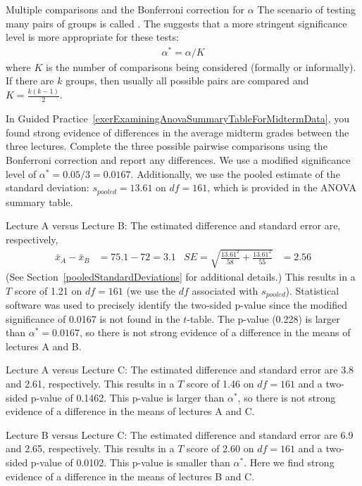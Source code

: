 \begin{onebox}{Multiple comparisons and the Bonferroni correction for $\alpha$}
The scenario of testing many pairs of groups is called . The  suggests that a more stringent significance level is more appropriate for these tests:
\begin{align*}
\alpha^* = \alpha / K
\end{align*}
where $K$ is the number of comparisons being considered (formally or informally). If there are $k$ groups, then usually all possible pairs are compared and $K=\frac{k(k-1)}{2}$.
\end{onebox}

\begin{examplewrap}
\begin{nexample}{In Guided Practice~\ref{exerExaminingAnovaSummaryTableForMidtermData}, you found strong evidence of differences in the average midterm grades between the three lectures. Complete the three possible pairwise comparisons using the Bonferroni correction and report any differences.} \label{multipleComparisonsOfThreeStatClasses}
We use a modified significance level of $\alpha^* = 0.05/3 = 0.0167$. Additionally, we use the pooled estimate of the standard deviation: $s_{pooled}=13.61$ on $df=161$, which is provided in the ANOVA summary table.

Lecture A versus Lecture B: The estimated difference and standard error are, respectively,
\begin{align*}
\bar{x}_A - \bar{x}_{B} &= 75.1 - 72 = 3.1
	&SE = \sqrt{\frac{13.61^2}{58} + \frac{13.61^2}{55}} &= 2.56
\end{align*}
(See Section~\vref{pooledStandardDeviations} for additional details.) This results in a $T$ score of 1.21 on $df = 161$ (we use the $df$ associated with $s_{pooled}$). Statistical software was used to precisely identify the two-sided p-value since the modified significance of 0.0167 is not found in the $t$-table. The p-value (0.228) is larger than $\alpha^*=0.0167$, so there is not strong evidence of a difference in the means of lectures A and B.

Lecture A versus Lecture C: The estimated difference and standard error are 3.8 and 2.61, respectively. This results in a $T$ score of 1.46 on $df = 161$ and a two-sided p-value of 0.1462. This p-value is larger than $\alpha^*$, so there is not strong evidence of a difference in the means of lectures A and C.

Lecture B versus Lecture C: The estimated difference and standard error are 6.9 and 2.65, respectively. This results in a $T$ score of 2.60 on $df = 161$ and a two-sided p-value of 0.0102. This p-value is smaller than $\alpha^*$. Here we find strong evidence of a difference in the means of lectures B and C.
\end{nexample}
\end{examplewrap}

